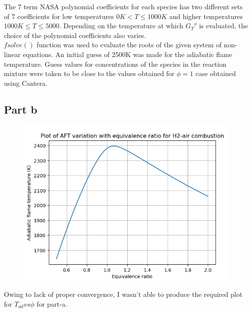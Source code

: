 \documentclass[a4paper,fleqn]{article}
\begin{document}
	 The 7 term NASA polynomial coefficients for each species has two different sets of 7 coefficients for low temperatures $0K < T \leq 1000K$ and higher temperatures $ 1000K \leq T \leq 5000$. Depending on the temperature at which ${G_T}^o$ is evaluated, the choice of the polynomial coefficients also varies. \\
	 
	 $fsolve()$ function was used to evaluate the roots of the given system of non-linear equations. An initial guess of 2500K was made for the adiabatic flame temperature. Guess values for concentrations of the species in the reaction mixture were taken to be close to the values obtained for $\phi = 1$ case obtained using Cantera.
	 \newpage
	\subsection*{Part b}
	\begin{figure}[!h]
	\includegraphics[width=17cm]{1_b}
	\centering
	\end{figure}
	Owing to lack of proper convergence, I wasn't able to produce the required plot for $T_{ad} vs \phi$ for part-a.
	\newpage
\end{document}
